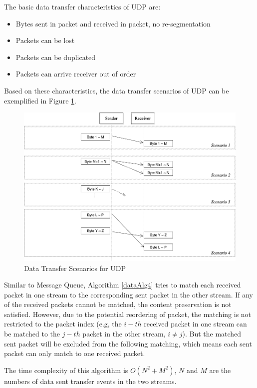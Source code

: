 The basic data transfer characteristics of UDP are:
\begin{itemize}
  \item Bytes sent in packet and received in packet, no re-segmentation
  \item Packets can be lost
  \item Packets can be duplicated
  \item Packets can arrive receiver out of order
\end{itemize}

Based on these characteristics, the data transfer scenarios of UDP can be exemplified in Figure \ref{upd}.
\begin{figure}[H]
\centerline{\includegraphics[scale=0.4]{Figures/udp}}
 \caption{Data Transfer Scenarios for UDP}
\label{upd}
\end{figure}

Similar to Message Queue, Algorithm \ref{dataAlg4} tries to match each received packet in one stream to the corresponding sent packet in the other stream. If any of the received packets cannot be matched, the content preservation is not satisfied. However, due to the potential reordering of packet, the matching is not restricted to the packet index (e.g, the $i-th$ received packet in one stream can be matched to the $j-th$ packet in the other stream, $i \neq j$). But the matched sent packet will be excluded from the following matching, which means each sent packet can only match to one received packet.

The time complexity of this algorithm is $O(N^2+M^2)$, $N$ and $M$ are the numbers of data sent transfer events in the two streams.

